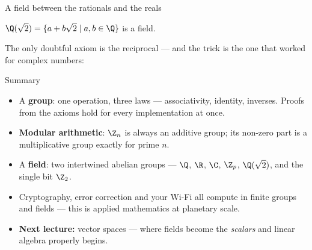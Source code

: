 \begin{frame}{A field between the rationals and the reals}
\begin{example}
$\Q(\sqrt2) = \{ a + b\sqrt2 \mid a, b \in \Q \}$ is a field.
\end{example}

The only doubtful axiom is the reciprocal — and the trick is the one that
worked for complex numbers:

\begin{steps}
\end{steps}
\end{frame}

\begin{frame}{Summary}
\begin{itemize}
\item A \textbf{group}: one operation, three laws — associativity, identity,
inverses. Proofs from the axioms hold for every implementation at once.
\pause
\item \textbf{Modular arithmetic}: $\Z_n$ is always an additive group;
its non-zero part is a multiplicative group exactly for prime $n$.
\pause
\item A \textbf{field}: two intertwined abelian groups — $\Q$, $\R$, $\C$,
$\Z_p$, $\Q(\sqrt2)$, and the single bit $\Z_2$.
\pause
\item Cryptography, error correction and your Wi-Fi all compute in finite
groups and fields — this is applied mathematics at planetary scale.
\pause
\item \textbf{Next lecture:} vector spaces — where fields become the
\emph{scalars} and linear algebra properly begins.
\end{itemize}
\end{frame}
